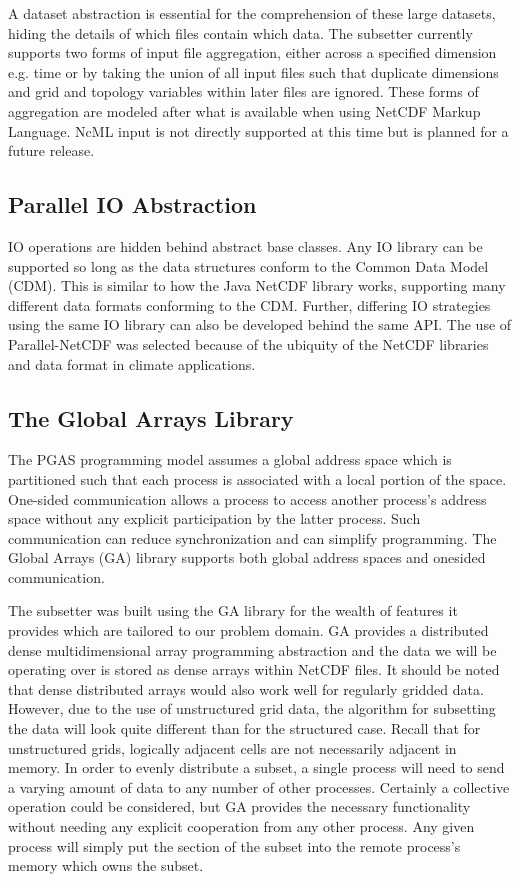 A dataset abstraction is essential for the comprehension of these large
datasets, hiding the details of which files contain which data.  The
subsetter currently supports two forms of input file aggregation, either
across a specified dimension e.g. time or by taking the union of all input
files such that duplicate dimensions and grid and topology variables within
later files are ignored.  These forms of aggregation are modeled after what is
available when using NetCDF Markup Language\cite{NcML}.  NcML input is not
directly supported at this time but is planned for a future release. 

\subsection{Parallel IO Abstraction}

IO operations are hidden behind abstract base classes.  Any IO library can be
supported so long as the data structures conform to the Common Data Model
(CDM)\cite{CDM}.  This is similar to how the Java NetCDF library works,
supporting many different data formats conforming to the CDM\cite{JavaNetCDF}.
Further, differing IO strategies using the same IO library can also be
developed behind the same API.  The use of Parallel-NetCDF was selected
because of the ubiquity of the NetCDF libraries and data format in climate
applications.

\subsection{The Global Arrays Library}

The PGAS programming model assumes a global address space which is partitioned
such that each process is associated with a local portion of the space.
One-sided communication allows a process to access another process's address
space without any explicit participation by the latter process.  Such
communication can reduce synchronization and can simplify
programming.  The Global Arrays (GA) library supports both global address spaces
and onesided communication.

The subsetter was built using the GA library for the wealth of features it
provides which are tailored to our problem domain.  GA provides a distributed
dense multidimensional array programming abstraction and the data we will be
operating over is stored as dense arrays within NetCDF files.  It should be
noted that dense distributed arrays would also work well for regularly gridded
data.  However, due to the use of unstructured grid data, the algorithm for
subsetting the data will look quite different than for the structured case.
Recall that for unstructured grids, logically adjacent cells are not
necessarily adjacent in memory.  In order to evenly distribute a subset, a
single process will need to send a varying amount of data to any number of
other processes.  Certainly a collective operation could be considered, but GA
provides the necessary functionality without needing any explicit cooperation
from any other process.  Any given process will simply put the section of the
subset into the remote process's memory which owns the subset.

